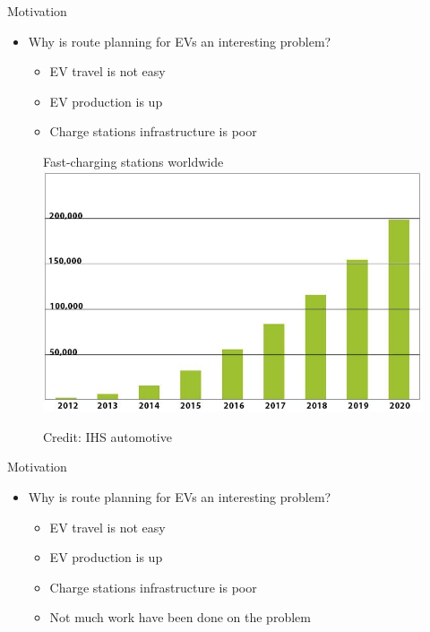 \begin{frame}{Motivation}
\begin{itemize}
\item Why is route planning for EVs an interesting problem?
\begin{itemize}
\item EV travel is not easy
\item EV production is up
\item Charge stations infrastructure is poor
\end{itemize}
\end{itemize}
\begin{figure}[h!]
  \centering
  Fast-charging stations worldwide
    \includegraphics[height=0.4\textwidth]{images/forecast2}
  
      \tiny Credit: IHS automotive
\end{figure}
\vspace{20cm}
\end{frame}

\begin{frame}{Motivation}
\begin{itemize}
\item Why is route planning for EVs an interesting problem?
\begin{itemize}
\item EV travel is not easy
\item EV production is up
\item Charge stations infrastructure is poor
\item Not much work have been done on the problem
\end{itemize}
\end{itemize}
\vspace{20cm}
\end{frame}
